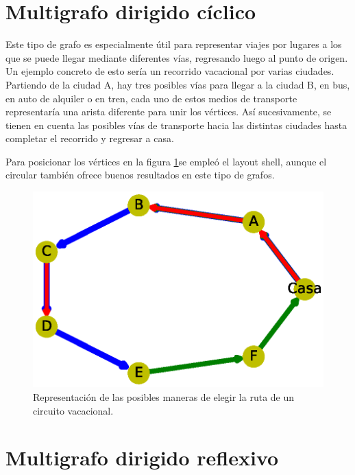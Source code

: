 \documentclass{article}
\begin{document}



\section{Multigrafo dirigido cíclico}

Este tipo de grafo es especialmente útil para representar viajes por lugares a los que se puede llegar mediante diferentes vías, regresando luego al punto de origen. Un ejemplo concreto de esto sería un recorrido vacacional por varias ciudades. Partiendo de la ciudad A, hay tres posibles vías  para llegar a la ciudad B, en bus, en auto de alquiler o en tren, cada uno de estos medios de transporte representaría una arista diferente para unir los vértices. Así sucesivamente, se tienen en cuenta las posibles vías de transporte hacia las distintas ciudades hasta completar el recorrido y regresar a casa. 

Para posicionar los vértices en la figura \ref{Figura 11}se empleó el layout shell, aunque el circular también ofrece buenos resultados en este tipo de grafos.


\begin{figure}
\begin{center}
  \includegraphics[width=.6\columnwidth]{fig11.eps}
  \caption{Representación de las posibles maneras de elegir la ruta de un circuito vacacional.}
  \end{center}
  \label{Figura 11}
\end{figure}




\section{Multigrafo dirigido reflexivo}
\end{document}
